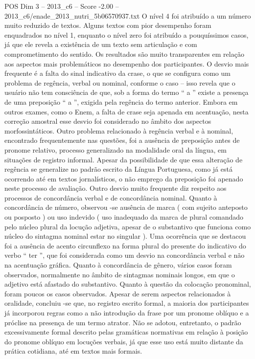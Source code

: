 \begin{textsample}{POS Dim 3 – 2013\_c6 – Score -2.00 – 2013\_c6/enade\_2013\_nutri\_5b06570937.txt}
O nível 4 foi atribuído a um número muito reduzido de textos.
Alguns textos com pior desempenho foram enquadrados no nível 1, enquanto o nível zero foi atribuído a pouquíssimos casos, já que ele revela a existência de um texto sem articulação e com comprometimento do sentido.
Os resultados são muito transparentes em relação aos aspectos mais problemáticos no desempenho dos participantes.
O desvio mais frequente é a falta do sinal indicativo da crase, o que se configura como um problema de regência, verbal ou nominal, conforme o caso – isso revela que o usuário não tem consciência de que, sob a forma do termo “ a ” existe a presença de uma preposição “ a ”, exigida pela regência do termo anterior.
Embora em outros exames, como o Enem, a falta de crase seja apenada em acentuação, nesta correção amostral esse desvio foi considerado no âmbito dos aspectos morfossintáticos.
Outro problema relacionado à regência verbal e à nominal, encontrado frequentemente nas questões, foi a ausência de preposição antes de pronome relativo, processo generalizado na modalidade oral da língua, em situações de registro informal.
Apesar da possibilidade de que essa alteração de regência se generalize no padrão escrito da Língua Portuguesa, como já está ocorrendo até em textos jornalísticos, o não emprego da preposição foi apenado neste processo de avaliação.
Outro desvio muito frequente diz respeito aos processos de concordância verbal e de concordância nominal.
Quanto à concordância de número, observou -se ausência de marca ( com sujeito anteposto ou posposto ) ou uso indevido ( uso inadequado da marca de plural comandado pelo núcleo plural da locução adjetiva, apesar de o substantivo que funciona como núcleo do sintagma nominal estar no singular ).
Uma ocorrência que se destacou foi a ausência de acento circunflexo na forma plural do presente do indicativo do verbo “ ter ”, que foi considerada como um desvio na concordância verbal e não na acentuação gráfica.
Quanto à concordância de gênero, vários casos foram observados, normalmente no âmbito de sintagmas nominais longos, em que o adjetivo está afastado do substantivo.
Quanto à questão da colocação pronominal, foram poucos os casos observados.
Apesar de serem aspectos relacionados à oralidade, concluiu -se que, no registro escrito formal, a maioria dos participantes já incorporou regras como a não introdução da frase por um pronome oblíquo e a próclise na presença de um termo atrator.
Não se adotou, entretanto, o padrão excessivamente formal descrito pelas gramáticas normativas em relação à posição do pronome oblíquo em locuções verbais, já que esse uso está muito distante da prática cotidiana, até em textos mais formais.

\end{textsample}
